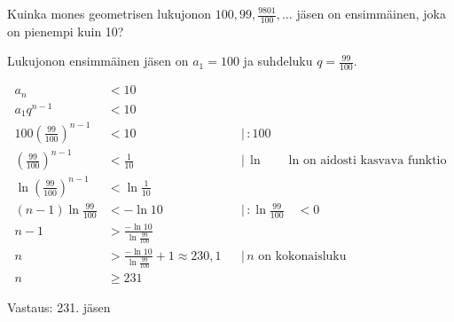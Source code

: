 \begin{esimerkki}

Kuinka mones geometrisen lukujonon $100, 99, \frac{9801}{100}, \ldots$ jäsen on ensimmäinen, joka on pienempi kuin 10?

Lukujonon ensimmäinen jäsen on $a_1=100$ ja suhdeluku $q=\frac{99}{100}$.

\begin{align*}
	            a_n &< 10  \\
	a_1q^{n-1} &< 10  \\
	100(\frac{99}{100})^{n-1} &< 10 & & | \, :100 \\
	(\frac{99}{100})^{n-1} &< \frac{1}{10}  & & | \,  \ln \qquad \text{ln on aidosti kasvava funktio}\\
	\ln (\frac{99}{100})^{n-1} &< \ln \frac{1}{10} \\
	(n-1)\ln \frac{99}{100} &< -\ln 10  & & | \, : \ln \frac{99}{100} \quad <0 \\
	n-1 &>  \frac{-\ln10}{\ln \frac{99}{100}} \\
	n &> \frac{-\ln10}{\ln \frac{99}{100}} +1\approx 230,1  & & | \, \text {$n$ on kokonaisluku} \\
	n &\ge 231
\end{align*}

Vastaus: 231. jäsen

\end{esimerkki}

